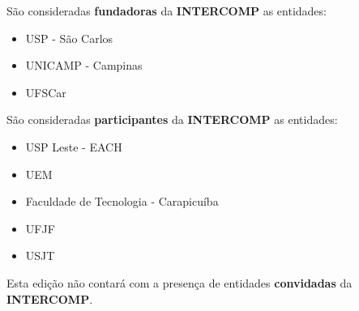\begin{article}
	\begin{xparagraph}
		São consideradas \textbf{fundadoras} da \textbf{INTERCOMP} as entidades:
		\begin{itemize}[noitemsep,leftmargin=2\parindent]
			\item USP - São Carlos
			\item UNICAMP - Campinas
			\item UFSCar
		\end{itemize}
	\end{xparagraph}

	\begin{xparagraph}
		São consideradas \textbf{participantes} da \textbf{INTERCOMP} as entidades:
		\begin{itemize}[noitemsep,leftmargin=2\parindent]
			\item USP Leste - EACH
			\item UEM
			\item Faculdade de Tecnologia - Carapicuíba
			\item UFJF
			\item USJT
		\end{itemize}
	\end{xparagraph}

	\begin{xparagraph}
		Esta edição não contará com a presença de entidades \textbf{convidadas} da \textbf{INTERCOMP}.
	\end{xparagraph}


\end{article}
